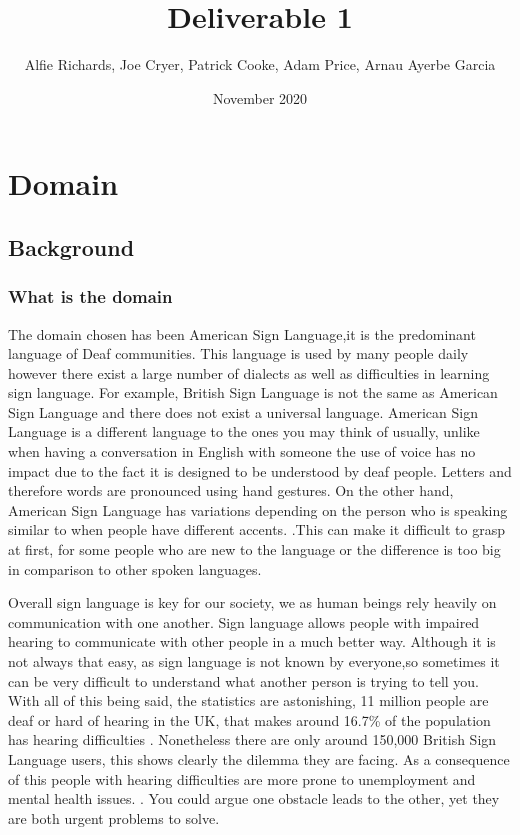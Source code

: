 \documentclass[10pt]{article}
\title{Deliverable 1}
\author{Alfie Richards, Joe Cryer, Patrick Cooke, Adam Price, Arnau Ayerbe Garcia}
\begin{document}
\date{November 2020}
\maketitle
\tableofcontents

\newpage

\section{Domain}
\subsection{Background}
\subsubsection{What is the domain}

The domain chosen has been American Sign Language,it is the predominant language of Deaf 
communities. This language is used by many people daily however there exist a large number of 
dialects as well as difficulties in learning sign language. For example, British Sign Language is 
not the same as American Sign Language and there does not exist a universal language. American Sign 
Language is a different language to the ones you may think of usually, unlike when having a 
conversation in English with someone the use of voice has no impact due to the fact it is designed 
to be understood by deaf people. Letters and therefore words are pronounced using hand gestures. On 
the other hand, American Sign Language has variations depending on the person who is speaking 
similar to when people have different accents. 
\cite{national_institute_of_deafness_and_other_communication_disorders_2020} .This can make it 
difficult to grasp at first, for some people who are new to the language or the difference is too 
big in comparison to other spoken languages. 

Overall sign language is key for our society, we as human beings rely heavily on communication with 
one another. Sign language allows people with impaired hearing to communicate with other people in a 
much better way. Although it is not always that easy, as sign language is not known by everyone,so 
sometimes it can be very difficult to understand what another person is trying to tell you. With all 
of this being said, the statistics are astonishing, 11 million people are deaf or hard of hearing in 
the UK, that makes around 16.7\% of the population has hearing difficulties . Nonetheless there are 
only around 150,000 British Sign Language users, this shows clearly the dilemma they are facing. As 
a consequence of this people with hearing difficulties are more prone to unemployment and mental 
health issues. \cite{gov.uk_2019}. You could argue one obstacle leads to the other, yet they are 
both urgent problems to solve.
\end{document}

